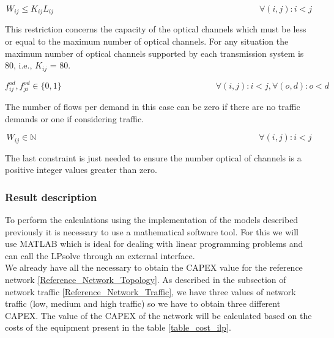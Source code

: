 \begin{equation}
W_{ij} \leq K_{ij} L_{ij} \qquad  \qquad \qquad \qquad \qquad \qquad \qquad \qquad \qquad \qquad \qquad \qquad \forall(i,j) : i < j
\label{ILPOpaque5_Surv}
\end{equation}

This restriction concerns the capacity of the optical channels which must be less or equal to the maximum number of optical channels. For any situation the maximum number of optical channels supported by each transmission system is 80, i.e., $K_{ij}$ = 80.

\begin{equation}
f_{ij}^{od} , f_{ji}^{od} \in \{0,1\}   \qquad \qquad \qquad \qquad \qquad \qquad \qquad \qquad \qquad
\forall(i,j) : i < j, \forall(o,d) : o < d
\label{ILPOpaque6_Surv}
\end{equation}

The number of flows per demand in this case can be zero if there are no traffic demands or one if considering traffic.

\begin{equation}
W_{ij} \in \mathbb{N}  \qquad \qquad \qquad \qquad \qquad \qquad \qquad \qquad \qquad \qquad \qquad \qquad \qquad
\forall(i,j) : i < j
\label{ILPOpaque7_Surv}
\end{equation}

The last constraint is just needed to ensure the number optical of channels is a positive integer values greater than zero.


\subsubsection{Result description}

To perform the calculations using the implementation of the models described previously it is necessary to use a mathematical software tool. For this we will use MATLAB which is ideal for dealing with linear programming problems and can call the LPsolve through an external interface.\\
We already have all the necessary to obtain the CAPEX value for the reference network \ref{Reference_Network_Topology}. As described in the subsection of network traffic \ref{Reference_Network_Traffic}, we have three values of network traffic (low, medium and high traffic) so we have to obtain three different CAPEX.
The value of the CAPEX of the network will be calculated based on the costs of the equipment present in the table \ref{table_cost_ilp}.\\


